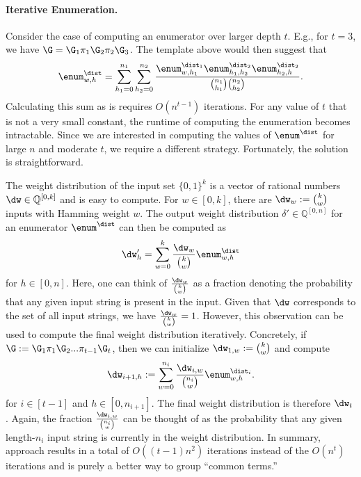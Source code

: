 \paragraph{Iterative Enumeration.} Consider the case of computing an enumerator over larger depth $t$. E.g.,  for $t=3$, we have $\G=\G_1\pi_1\G_2\pi_2\G_3$. The template above would then suggest that 
$$
\enum^\dist_{w,h}=\sum_{h_1=0}^{n_1}\sum_{h_2=0}^{n_2}\frac{\enum^{\dist_1}_{w,h_1} \enum^{\dist_2}_{h_1,h_2} \enum^{\dist_2}_{h_2,h} }{{n_1\choose h_1}{n_2\choose h_2}}.
$$
Calculating this sum as is requires $O(n^{t-1})$ iterations. For any value of $t$ that is not a very small constant, the runtime of computing the enumeration becomes intractable. 
Since we are interested in computing the values of $\enum^\dist$ for large $n$ and moderate $t$, we require a different strategy. Fortunately, the solution is straightforward.

The weight distribution of the input set $\{0,1\}^k$ is a vector of rational numbers $\dw\in \mathbb{Q}^{[0,k]}$ and is easy to compute. For $w\in[0,k]$, there are $\dw_w:={k\choose w}$ inputs with Hamming weight $w$. The output weight distribution $\delta'\in \mathbb{Q}^{[0,n]}$ for an enumerator $\enum^\dist$ can then be computed as 
$$
    \dw'_{h} = \sum_{w=0}^k \frac{\dw_w}{{k\choose w}} \enum^\dist_{w,h}
$$
for $h\in [0,n]$. Here, one can think of $ \frac{\dw_w}{{k\choose w}}$ as a fraction denoting the probability that any given input string is present in the input. Given that $\dw$ corresponds to the set of all input strings, we have $ \frac{\dw_w}{{k\choose w}}=1$. 
However, this observation can be used to compute the final weight distribution iteratively. Concretely, if $\G:=\G_1\pi_1\G_2 ... \pi_{t-1}\G_t$, then we can initialize $\dw_{1,w}:={k\choose w}$ and compute 
$$
    \dw_{i+1, h}:=\sum_{w=0}^{n_i} \frac{\dw_{i,w}}{{n_i\choose w}} \enum^{\dist_i}_{w,h}.
$$
for $i\in [t-1]$ and $h\in [0,n_{i+1}]$. The final weight distribution is therefore $\dw_t$. Again, the fraction $ \frac{\dw_{i,w}}{{n_i\choose w}}$ can be thought of as the probability that any given length-$n_i$ input string is currently in the weight distribution. In summary, approach results in a total of $O((t-1)n^2)$ iterations instead of the $O(n^t)$ iterations and is purely a better way to group ``common terms.''




